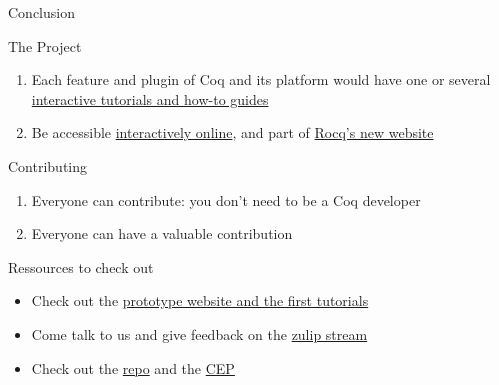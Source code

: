 \documentclass[10pt]{beamer}
\begin{document}
\begin{frame}[fragile]{Conclusion}
  \begin{tcbObj}{The Project}
    \begin{enumerate}[leftmargin=10pt]
      \item Each feature and plugin of Coq and its platform would have one
            or several \ul{interactive tutorials and how-to guides}
      \item Be accessible \ul{interactively online}, and part of \ul{Rocq's new website}
    \end{enumerate}
  \end{tcbObj}
  \begin{tcbObj}{Contributing}
    \begin{enumerate}[leftmargin=10pt]
      \item Everyone can contribute: you don't need to be a Coq developer
      \item Everyone can have a valuable contribution
    \end{enumerate}
  \end{tcbObj}
  \begin{tcbProp}{Ressources to check out}
    \begin{itemize}[label=$-$,leftmargin=10pt]
      \item Check out the \textcolor{blue}{\href{https://coq.inria.fr/platform-docs/}{prototype website and the first tutorials}}
      \item Come talk to us and give feedback on the \textcolor{blue}{\href{https://www.theozimmermann.net/platform-docs/}{zulip stream}}
      \item Check out the \textcolor{blue}{\href{https://github.com/coq/platform-docs}{repo}} and the \textcolor{blue}{\href{https://github.com/coq/ceps/pull/91}{CEP}}
    \end{itemize}
  \end{tcbProp}
\end{frame}
\end{document}
